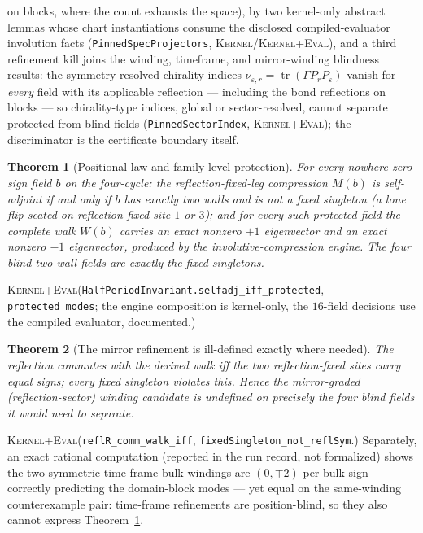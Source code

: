 \documentclass[11pt]{article}
\newcommand{\Kernel}{\textcolor{kernelcolor}{\textsc{Kernel}}}
\newcommand{\DraftTrust}{\textcolor{draftcolor}{\textsc{Kernel+Eval}}}
\newtheorem{theorem}{Theorem}
\begin{document}
on blocks, where the count exhausts the space), by two kernel-only
abstract lemmas whose chart instantiations consume the disclosed
compiled-evaluator involution facts
(\texttt{PinnedSpecProjectors}, \Kernel{}/\DraftTrust{}), and a third
refinement kill joins the
winding, timeframe, and mirror-winding blindness results: the
symmetry-resolved chirality indices
$\nu_{\varepsilon,r}=\operatorname{tr}(\Gamma P_r P_\varepsilon)$ vanish
for \emph{every} field with its applicable reflection --- including the
bond reflections on blocks --- so chirality-type indices, global or
sector-resolved, cannot separate protected from blind fields
(\texttt{PinnedSectorIndex}, \DraftTrust{}); the discriminator is the
certificate boundary itself.

\begin{theorem}[Positional law and family-level protection]\label{thm:law}
For every nowhere-zero sign field $b$ on the four-cycle: the
reflection-fixed-leg compression $M(b)$ is self-adjoint if and only if $b$
has exactly two walls and is not a fixed singleton (a lone flip seated on
reflection-fixed site $1$ or $3$); and for every such protected field the
\emph{complete} walk $W(b)$ carries an exact nonzero $+1$ eigenvector and
an exact nonzero $-1$ eigenvector, produced by the involutive-compression
engine.  The four blind two-wall fields are exactly the fixed singletons.
\end{theorem}
\noindent\DraftTrust{}\quad(\texttt{HalfPeriodInvariant.selfadj\_iff\_protected},
\texttt{protected\_modes}; the engine composition is kernel-only, the
$16$-field decisions use the compiled evaluator, documented.)

\begin{theorem}[The mirror refinement is ill-defined exactly where needed]
\label{thm:mirror}
The reflection commutes with the derived walk iff the two reflection-fixed
sites carry equal signs; every fixed singleton violates this.  Hence the
mirror-graded (reflection-sector) winding candidate is undefined on
precisely the four blind fields it would need to separate.
\end{theorem}
\noindent\DraftTrust{}\quad(\texttt{reflR\_comm\_walk\_iff},
\texttt{fixedSingleton\_not\_reflSym}.)  Separately, an exact
rational computation (reported in the run record, not formalized) shows the
two symmetric-time-frame bulk windings are $(0,\mp2)$ per bulk sign ---
correctly predicting the domain-block modes --- yet equal on the
same-winding counterexample pair: time-frame refinements are
position-blind, so they also cannot express Theorem~\ref{thm:law}.
\end{document}

